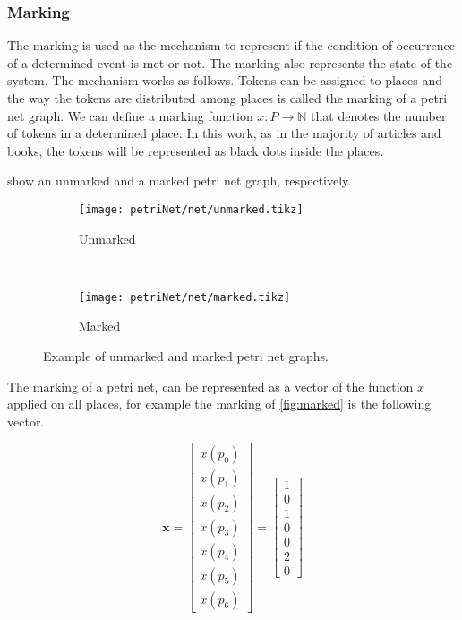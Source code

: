 \subsubsection{Marking}
\label{sec:marking}

The marking is used as the mechanism to
represent if the condition of occurrence of a determined event is met or not.
The marking also represents the state of the system. The mechanism
works as follows. Tokens can be assigned to places and the way the tokens are
distributed among places is called the marking of a petri net graph. We can define a marking function $x :
P \rightarrow \mathbb{N}$ that denotes the number of tokens in a determined place.
In this
work, as in the majority of articles and books, the tokens will be
represented as black dots inside the places. 

 show an unmarked and a marked petri net graph, respectively.
\begin{figure}[H]
\begin{subfigure}[t]{0.45\textwidth}
  \centering
  \texttt{[image: petriNet/net/unmarked.tikz]}
  \caption{Unmarked}
  \label{fig:unmarked}
\end{subfigure}
~
\begin{subfigure}[t]{0.45\textwidth}
  \centering
  \texttt{[image: petriNet/net/marked.tikz]}
  \caption{Marked}
  \label{fig:marked}
\end{subfigure}
\caption{Example of unmarked and marked petri net graphs.}
\end{figure}

The marking of a petri net, can be represented as a
vector of the function $x$ applied on all places, for example the marking of 
\autoref{fig:marked} is the following vector.

\begin{equation*}
\mathbf{x}=\begin{bmatrix}
  x(p_0)\\
  x(p_1)\\
  x(p_2)\\
  x(p_3)\\
  x(p_4)\\
  x(p_5)\\
  x(p_6)
\end{bmatrix} =
\begin{bmatrix}
  1\\
  0\\
  1\\
  0\\
  0\\
  2\\
  0
\end{bmatrix}
\end{equation*}

